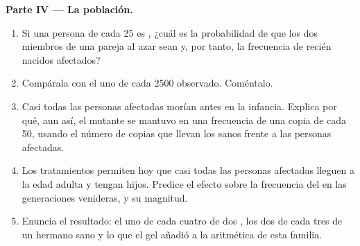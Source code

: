 \begin{problem}
\medskip
\noindent\textbf{Parte IV --- La población.}
\begin{enumerate}[resume]
  \item Si una persona de cada 25 es , ¿cuál es la
        probabilidad de que los dos miembros de una pareja al azar sean
         y, por tanto, la frecuencia de recién nacidos
        afectados?
  \item Compárala con el uno de cada 2500 observado. Coméntalo.
  \item Casi todas las personas afectadas morían antes en la infancia.
        Explica por qué, aun así, el  mutante se mantuvo en una
        frecuencia de una copia de cada 50, usando el número de copias
        que llevan los  sanos frente a las personas
        afectadas.
  \item Los tratamientos permiten hoy que casi todas las personas
        afectadas lleguen a la edad adulta y tengan hijos. Predice el
        efecto sobre la frecuencia del  en las generaciones
        venideras, y su magnitud.
  \item Enuncia el resultado: el uno de cada cuatro de dos ,
        los dos de cada tres de un hermano sano y lo que el gel añadió
        a la aritmética de esta familia.
\end{enumerate}
\end{problem}
